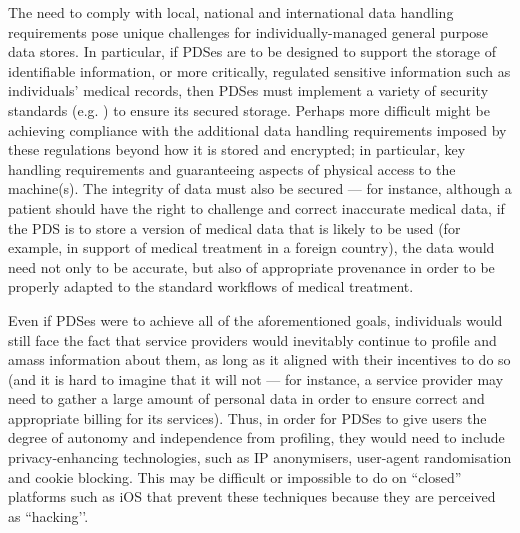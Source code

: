 \documentclass[graybox]{svmult}
\begin{document}
The need to comply with local, national and international data handling requirements pose unique challenges for individually-managed general purpose data stores. In particular, if  PDSes are to be designed to support the storage of identifiable information, or more critically, regulated sensitive information such as individuals’ medical records, then PDSes must implement a variety of security standards (e.g. \cite{}) to ensure its secured storage.  Perhaps more difficult might be achieving compliance with the additional data handling requirements imposed by these regulations beyond how it is stored and encrypted; in particular, key handling requirements and guaranteeing aspects of physical access to the machine(s). The integrity of data must also be secured --- for instance, although a patient should have the right to challenge and correct inaccurate medical data, if the PDS is to store a version of medical data that is likely to be used (for example, in support of medical treatment in a foreign country), the data would need not only to be accurate, but also of appropriate provenance in order to be properly adapted to the standard workflows of medical treatment.

Even if PDSes were to achieve all of the aforementioned goals, individuals would still face the fact that service providers would inevitably continue to profile and amass information about them, as long as it aligned with their incentives to do so (and it is hard to imagine that it will not --- for instance, a service provider may need to gather a large amount of personal data in order to ensure correct and appropriate billing for its services).  Thus, in order for PDSes to give users the degree of autonomy and independence from profiling, they would need to include privacy-enhancing technologies, such as IP anonymisers, user-agent randomisation and cookie blocking. This may be difficult or impossible to do on ``closed'' platforms such as iOS that prevent these techniques because they are perceived as ``hacking’’.

\end{document}
